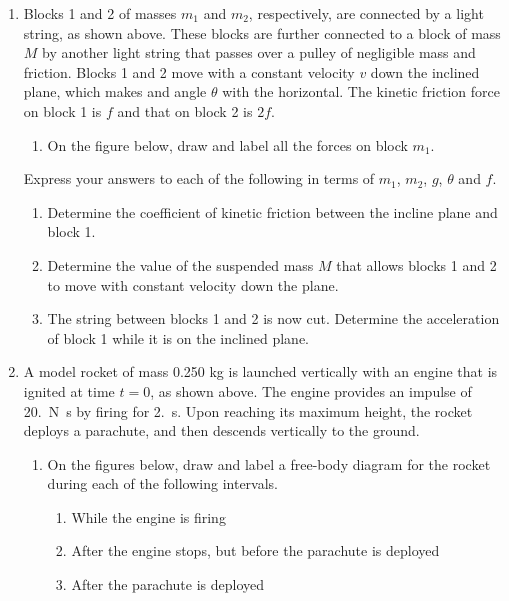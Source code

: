 \documentclass{../../../oss-apphys}
\begin{document}
\begin{enumerate}[leftmargin=15pt]    
\item Blocks 1 and 2 of masses $m_1$ and $m_2$, respectively, are connected by a
  light string, as shown above. These blocks are further connected to a block of
  mass $M$ by another light string that passes over a pulley of negligible mass
  and friction. Blocks 1 and 2 move with a constant velocity $v$ down the
  inclined plane, which makes and angle $\theta$ with the horizontal. The
  kinetic friction force on block 1 is $f$ and that on block 2 is $2f$.
  \begin{enumerate}[leftmargin=18pt,topsep=0pt,noitemsep]
  \item On the figure below, draw and label all the forces on block $m_1$.
    
  \end{enumerate}
  Express your answers to each of the following in terms of $m_1$, $m_2$, $g$,
  $\theta$ and $f$.
  \begin{enumerate}[leftmargin=18pt,topsep=0pt,noitemsep,resume]
  \item Determine the coefficient of kinetic friction between the incline plane
    and block 1.
  \item Determine the value of the suspended mass $M$ that allows blocks 1 and 2
    to move with constant velocity down the plane.
  \item The string between blocks 1 and 2 is now cut. Determine the
    acceleration of block 1 while it is on the inclined plane.
  \end{enumerate}
  \newpage
  
  
\item A model rocket of mass 0.250 kg is launched vertically with an engine
  that is ignited at time $t=0$, as shown above. The engine provides an impulse
  of \SI{20.}{\newton\second} by firing for \SI{2.}{\second}. Upon reaching its
  maximum height, the rocket deploys a parachute, and then descends vertically
  to the ground.
  \begin{enumerate}[leftmargin=18pt,topsep=0pt,noitemsep]
  \item On the figures below, draw and label a free-body diagram for the rocket
    during each of the following intervals.
    \begin{multicols}{3}
      \begin{enumerate}
      \item While the engine is firing
        \columnbreak
      \item After the engine stops, but before the parachute is deployed
        \columnbreak
      \item After the parachute is deployed
      \end{enumerate}
    \end{multicols}
    \begin{multicols}{3}
      

\end{multicols}
\end{enumerate}
\end{enumerate}
\end{document}
